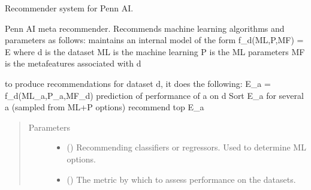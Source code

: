 \documentclass[letterpaper,10pt,english]{sphinxmanual}
\begin{document}
\label{\detokenize{index:module-ai.recommender.meta_recommender}}
Recommender system for Penn AI.

\begin{fulllineitems}
\label{\detokenize{index:ai.recommender.meta_recommender.MetaRecommender}}
Penn AI meta recommender.
Recommends machine learning algorithms and parameters as follows:
maintains an internal model of the form f\_d(ML,P,MF) = E
where
d is the dataset
ML is the machine learning
P is the ML parameters
MF is the metafeatures associated with d

to produce recommendations for dataset d, it does the following:
E\_a = f\_d(ML\_a,P\_a,MF\_d) prediction of performance of a on d
Sort E\_a for several a (sampled from ML+P options)
recommend top E\_a
\begin{quote}\begin{description}
\item[{Parameters}] \leavevmode\begin{itemize}
\item {} 
 (\sphinxstyleliteralemphasis{\sphinxupquote{, }}) \textendash{} Recommending classifiers or regressors. Used to determine ML options.

\item {} 
 (\sphinxstyleliteralemphasis{\sphinxupquote{ (}}\sphinxstyleliteralemphasis{\sphinxupquote{, }}\sphinxstyleliteralemphasis{\sphinxupquote{)}}) \textendash{} The metric by which to assess performance on the datasets.

\end{itemize}


\end{description}
\end{quote}
\end{fulllineitems}
\end{document}
